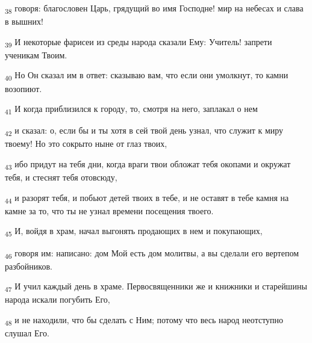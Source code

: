 \begin{tcolorbox}
\textsubscript{38} говоря: благословен Царь, грядущий во имя Господне! мир на небесах и слава в вышних!
\end{tcolorbox}
\begin{tcolorbox}
\textsubscript{39} И некоторые фарисеи из среды народа сказали Ему: Учитель! запрети ученикам Твоим.
\end{tcolorbox}
\begin{tcolorbox}
\textsubscript{40} Но Он сказал им в ответ: сказываю вам, что если они умолкнут, то камни возопиют.
\end{tcolorbox}
\begin{tcolorbox}
\textsubscript{41} И когда приблизился к городу, то, смотря на него, заплакал о нем
\end{tcolorbox}
\begin{tcolorbox}
\textsubscript{42} и сказал: о, если бы и ты хотя в сей твой день узнал, что служит к миру твоему! Но это сокрыто ныне от глаз твоих,
\end{tcolorbox}
\begin{tcolorbox}
\textsubscript{43} ибо придут на тебя дни, когда враги твои обложат тебя окопами и окружат тебя, и стеснят тебя отовсюду,
\end{tcolorbox}
\begin{tcolorbox}
\textsubscript{44} и разорят тебя, и побьют детей твоих в тебе, и не оставят в тебе камня на камне за то, что ты не узнал времени посещения твоего.
\end{tcolorbox}
\begin{tcolorbox}
\textsubscript{45} И, войдя в храм, начал выгонять продающих в нем и покупающих,
\end{tcolorbox}
\begin{tcolorbox}
\textsubscript{46} говоря им: написано: дом Мой есть дом молитвы, а вы сделали его вертепом разбойников.
\end{tcolorbox}
\begin{tcolorbox}
\textsubscript{47} И учил каждый день в храме. Первосвященники же и книжники и старейшины народа искали погубить Его,
\end{tcolorbox}
\begin{tcolorbox}
\textsubscript{48} и не находили, что бы сделать с Ним; потому что весь народ неотступно слушал Его.
\end{tcolorbox}
